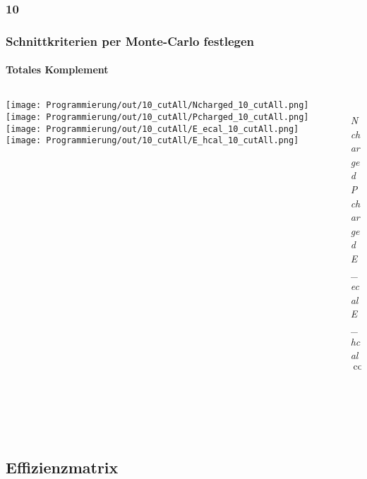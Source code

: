 \documentclass{beamer}
\begin{document}
\subsubsection{10}
\begin{frame}
	\frametitle{Schnittkriterien per Monte-Carlo festlegen}
	\framesubtitle{Totales Komplement}
	\begin{columns}
		\begin{column}{0.95\textwidth}
			\texttt{[image: Programmierung/out/10\_cutAll/Ncharged\_10\_cutAll.png]}
			\texttt{[image: Programmierung/out/10\_cutAll/Pcharged\_10\_cutAll.png]}
			\newline
			\texttt{[image: Programmierung/out/10\_cutAll/E\_ecal\_10\_cutAll.png]}
			\texttt{[image: Programmierung/out/10\_cutAll/E\_hcal\_10\_cutAll.png]}
		\end{column}
		\begin{column}{0.2\textwidth}
			\\
			{\color{blue}\textit{Ncharged}}\newline
					\\
			{\color{blue}\textit{Pcharged}}\newline
					\\
			{\color[rgb]{0.6,0.6,0}\textit{E\_ecal}}\newline
					\\
			{\color[rgb]{1,0,1}\textit{E\_hcal}}\newline
					\\
			$\cos\_thet$\newline
					\\
			\\
			\\
			\\
			\\
		\end{column}
	\end{columns}
\end{frame}

\subsection{Effizienzmatrix}
\end{document}
